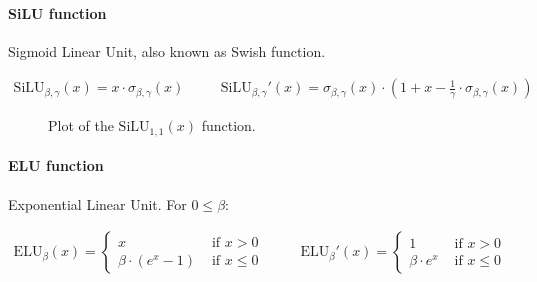 \documentclass[titlepage]{article}
\begin{document}
        \paragraph{SiLU function}

          Sigmoid Linear Unit, also known as Swish function.

          \begin{align*}
            \text{SiLU}_{\beta, \gamma} (x) = x \cdot \sigma_{\beta, \gamma}(x)
            & \quad &
            \text{SiLU}_{\beta, \gamma}' (x)
              = \sigma_{\beta, \gamma}(x)
                \cdot
                \left(
                  1 + x - \frac{1}{\gamma} \cdot \sigma_{\beta, \gamma}(x)
                \right)
          \end{align*}

          \begin{figure}[!htb]
            \centering
            \caption{%
              Plot of the $\text{SiLU}_{1, 1}(x)$ function.
            }
          \end{figure}

        \paragraph{ELU function}

          Exponential Linear Unit. For $0 \leq \beta$:

          \begin{align*}
            \text{ELU}_\beta (x) =
              \begin{cases}
                x & \text{ if } x > 0 \\
                \beta \cdot (e^x - 1) & \text{ if } x \leq 0
              \end{cases}
            & \quad &
            \text{ELU}_\beta' (x) =
              \begin{cases}
                1 & \text{ if } x > 0 \\
                \beta \cdot e^x & \text{ if } x \leq 0
              \end{cases}
          \end{align*}
\end{document}
